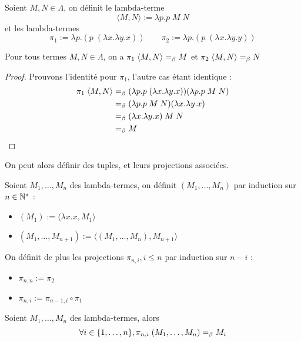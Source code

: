 \begin{defi}[Paires]
    Soient $M,N\in\Lambda$, on définit le lambda-terme $$\langle M,N\rangle := \lambda p.p\;M\;N$$ et les lambda-termes $$\pi_1 := \lambda p.(p\;(\lambda x.\lambda y.x))\qquad\pi_2 := \lambda p.(p\;(\lambda x.\lambda y.y))$$
\end{defi}

\begin{prop}
    Pour tous termes $M,N\in\Lambda$, on a $\pi_1\;\langle M,N\rangle=_\beta M$ et $\pi_2\;\langle M,N\rangle =_\beta N$
\end{prop}

\begin{proof}
    Prouvons l'identité pour $\pi_1$, l'autre cas étant identique :
    \begin{align*}
        \pi_1\;\langle M,N\rangle &=_\beta (\lambda p.p\;(\lambda x.\lambda y.x))(\lambda p.p\;M\;N)\\
        &=_\beta (\lambda p.p\;M\;N)(\lambda x.\lambda y.x)\\
        &=_\beta (\lambda x.\lambda y.x)\;M\;N\\
        &=_\beta M
    \end{align*}
\end{proof}

On peut alors définir des tuples, et leurs projections associées.

\begin{defi}[Tuple]
    Soient $M_1,\ldots,M_n$ des lambda-termes, on définit $(M_1,\ldots,M_n)$ par induction sur $n\in\mathbb{N}^*$ :
    \begin{itemize}[label=$\bullet$]
        \item $(M_1) := \langle \lambda x.x,M_1\rangle$
        \item $(M_1,\ldots,M_{n+1}) := \langle (M_1,\ldots,M_n),M_{n+1}\rangle$
    \end{itemize}

    On définit de plus les projections $\pi_{n,i}, i\leq n$ par induction sur $n-i$ :
    \begin{itemize}[label=$\bullet$]
        \item $\pi_{n,n} := \pi_2$
        \item $\pi_{n,i} := \pi_{n-1,i}\circ \pi_1$
    \end{itemize}
\end{defi}

\begin{prop}
    Soient $M_1,\ldots,M_n$ des lambda-termes, alors $$\forall i\in \{1,\ldots,n\}, \pi_{n,i}\;(M_1,\ldots,M_n) =_\beta M_i$$
\end{prop}

